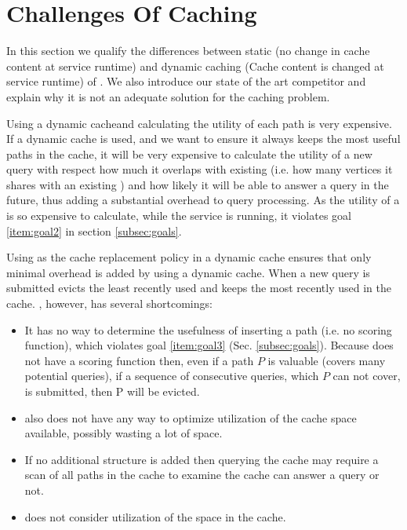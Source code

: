 \section{Challenges Of \spath Caching}\label{sec:competitors}

In this section we qualify the differences between static (no change in cache content at service runtime) and dynamic caching (Cache content is changed at service runtime) of \spathsns. We also introduce our state of the art competitor and explain why it is not an adequate solution for the \spath caching problem.


Using a dynamic cache\footnotemark and calculating the utility of each path is very expensive. If a dynamic cache is used, and we want to ensure it always keeps the most useful paths in the cache, it will be very expensive to calculate the utility of a new query with respect how much it overlaps with existing \spaths (i.e. how many vertices it shares with an existing \spathns) and how likely it will be able to answer a query in the future, thus adding a substantial overhead to query processing. As the utility of a \spath is so expensive to calculate, while the \spath service is running, it 
violates goal \ref{item:goal2} in section \ref{subsec:goals}.

Using \lru as the cache replacement policy in a dynamic cache ensures that only minimal overhead is added by using a dynamic cache. When a new query is submitted \lru evicts the least recently used \spath and keeps the most recently used \spaths in the cache.
\lru, however, has several shortcomings: 
\begin{itemize}
\item It has no way to determine the usefulness of inserting a path (i.e. no scoring function), which violates goal \ref{item:goal3} (Sec. \ref{subsec:goals}). Because \lru does not have a scoring function then, even if a path $P$ is valuable (covers many potential queries), if a sequence of consecutive queries, which $P$ can not cover, is submitted, then P will be evicted. 
\item \lru also does not have any way to optimize utilization of the cache space available, possibly wasting a lot of space. 
\item If no additional structure is added then querying the cache may require a scan of all paths in the cache to examine the cache can answer a query or not.
\item \lru does not consider utilization of the space in the cache.
\end{itemize}



